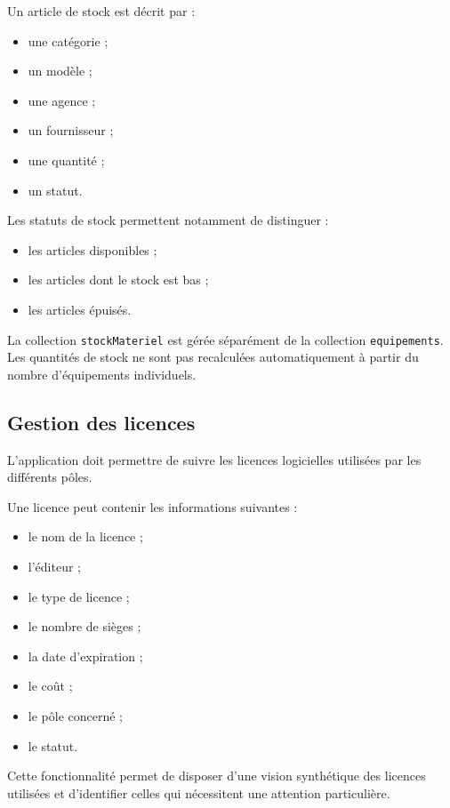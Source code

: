 \documentclass{rapportENSIAS}
\begin{document}
Un article de stock est décrit par :

\begin{itemize}
\item une catégorie ;
\item un modèle ;
\item une agence ;
\item un fournisseur ;
\item une quantité ;
\item un statut.
\end{itemize}

Les statuts de stock permettent notamment de distinguer :

\begin{itemize}
\item les articles disponibles ;
\item les articles dont le stock est bas ;
\item les articles épuisés.
\end{itemize}

La collection \texttt{stockMateriel} est gérée séparément de la collection \texttt{equipements}. Les quantités de stock ne sont pas recalculées automatiquement à partir du nombre d’équipements individuels.

\subsection{Gestion des licences}

L’application doit permettre de suivre les licences logicielles utilisées par les différents pôles.

Une licence peut contenir les informations suivantes :

\begin{itemize}
\item le nom de la licence ;
\item l’éditeur ;
\item le type de licence ;
\item le nombre de sièges ;
\item la date d’expiration ;
\item le coût ;
\item le pôle concerné ;
\item le statut.
\end{itemize}

Cette fonctionnalité permet de disposer d’une vision synthétique des licences utilisées et d’identifier celles qui nécessitent une attention particulière.
\end{document}
